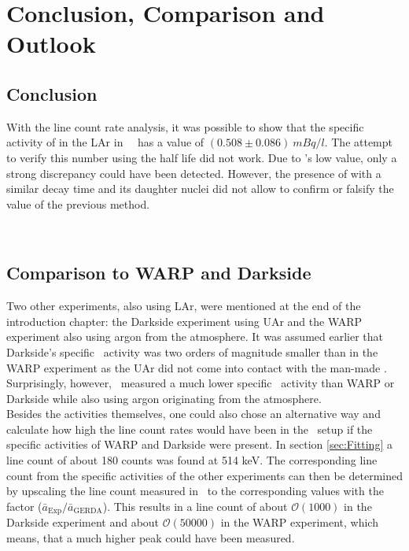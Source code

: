 \documentclass[encoding=utf8,british]{tumphthesis}
\begin{document}


\chapter{Conclusion, Comparison and Outlook}
\label{sec:ConcAndOutlook}
\section{Conclusion}

With the line count rate analysis, it was possible to show that the specific activity of  in the LAr in \gerda\ \PII\ has a value of $(0.508\pm0.086) \ \unit{mBq} / \unit{l}$.
The attempt to verify this number using the half life did not work.
Due to \Kr's low value, only a strong discrepancy could have been detected.
However, the presence of  with a similar decay time and its daughter nuclei  did not allow to confirm or falsify the value of the previous method.

\\
\section{Comparison to WARP and Darkside}

Two other experiments, also using LAr, were mentioned at the end of the introduction chapter: the Darkside experiment using UAr and the WARP experiment also using argon from the atmosphere.
It was assumed earlier that Darkside's specific \Kr\ activity was two orders of magnitude smaller than in the WARP experiment as the UAr did not come into contact with the man-made \Kr.
Surprisingly, however, \gerda\ measured a much lower specific \Kr\ activity than WARP or Darkside while also using argon originating from the atmosphere.
\\

Besides the activities themselves, one could also chose an alternative way and calculate how high the line count rates would have been in the \gerda\ setup if the specific activities of WARP and Darkside were present.
In section \ref{sec:Fitting} a line count of about 180 counts was found at 514 keV.
The corresponding line count from the specific activities of the other experiments can then be determined by upscaling the line count measured in \gerda\ to the corresponding values with the factor ($\bar{a}_{\mathrm{Exp}}/\bar{a}_{\mathrm{GERDA}}$).
This results in a line count of about $\mathcal{O}(1000)$ in the Darkside experiment and about $\mathcal{O}(50000)$ in the WARP experiment, which means, that a much higher peak could have been measured.
\\
\end{document}
